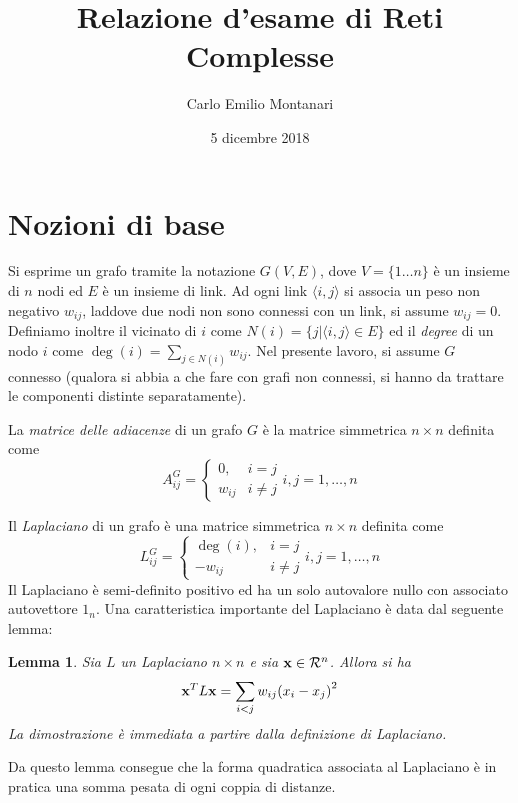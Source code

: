 \documentclass[10pt,a4paper]{article}
\title{Relazione d'esame di Reti Complesse}
\author{Carlo Emilio Montanari}
\date{5 dicembre 2018}
\newtheorem{lemma}{Lemma}[section]
\begin{document}
\maketitle

\tableofcontents

\section{Nozioni di base}\label{sec:base}

Si esprime un grafo tramite la notazione \(G(V,E)\), dove \(V=\{1\ldots n\} \) è un insieme di \(n\) nodi ed \(E\) è un insieme di link.
Ad ogni link \(\langle i , j\rangle \) si associa un peso non negativo \(w_{ij}\), laddove due nodi non sono connessi con un link, si assume \(w_{ij}=0\).
Definiamo inoltre il vicinato di \(i\) come \(N(i)=\{j|\langle i,j \rangle \in E\} \) ed il \textit{degree} di un nodo \(i\) come \(\deg(i) = \sum_{j\in N(i)} w_{ij}\).
Nel presente lavoro, si assume \(G\) connesso (qualora si abbia a che fare con grafi non connessi, si hanno da trattare le componenti distinte separatamente).

La \textit{matrice delle adiacenze} di un grafo \(G\) è la matrice simmetrica \(n \times n\) definita come
\begin{equation}
    A_{ij}^G =
    \begin{cases}
        0, & i = j \\
        w_{ij} & i \ne j
    \end{cases}
    i,j = 1,\ldots,n
\end{equation}

Il \textit{Laplaciano} di un grafo è una matrice simmetrica \(n \times n\) definita come
\begin{equation}
    L_{ij}^G =
    \begin{cases}
        \deg(i), & i = j \\
        -w_{ij} & i \ne j
    \end{cases}
    i,j = 1,\ldots,n
\end{equation} 
Il Laplaciano è semi-definito positivo ed ha un solo autovalore nullo con associato autovettore \(1_n\).
Una caratteristica importante del Laplaciano è data dal seguente lemma:
\begin{lemma}\label{lem:laplaciano_quadratico}
    Sia \(L\) un Laplaciano \(n\times n\) e sia \(\vb{x}\in \mathcal{R}^n\). Allora si ha
    \begin{equation}
        \vb{x}^T L \vb{x} = \sum_{i<j} w_{ij}{(x_i - x_j)}^2
    \end{equation}
    La dimostrazione è immediata a partire dalla definizione di Laplaciano.
\end{lemma}
Da questo lemma consegue che la forma quadratica associata al Laplaciano è in pratica una somma pesata di ogni coppia di distanze.
\end{document}

